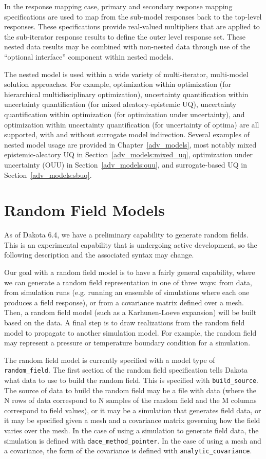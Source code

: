 In the response mapping case, primary and secondary response
mapping specifications are used to map from the sub-model responses
back to the top-level responses.  These specifications provide
real-valued multipliers that are applied to the sub-iterator response
results to define the outer level response set.  These nested data
results may be combined with non-nested data through use of the 
``optional interface'' component within nested models.

The nested model is used within a wide variety of multi-iterator,
multi-model solution approaches.  For example, optimization within
optimization (for hierarchical multidisciplinary optimization),
uncertainty quantification within uncertainty quantification (for
mixed aleatory-epistemic UQ), uncertainty quantification within
optimization (for optimization under uncertainty), and optimization
within uncertainty quantification (for uncertainty of optima) are all
supported, with and without surrogate model indirection.  Several
examples of nested model usage are provided in
Chapter~\ref{adv_models}, most notably mixed epistemic-aleatory UQ in
Section~\ref{adv_models:mixed_uq}, optimization under uncertainty
(OUU) in Section~\ref{adv_models:ouu}, and surrogate-based UQ in
Section~\ref{adv_models:sbuq}.

\section{Random Field Models} \label{models:randomfield}
As of Dakota 6.4, we have a preliminary capability to generate random fields. 
This is an experimental capability that is undergoing active development, 
so the following description and the associated syntax may change.  

Our goal with a random field model is to have a fairly general capability, where 
we can generate a random field representation in one of three ways: 
from data, from simulation runs (e.g. running an ensemble of simulations where 
each one produces a field response), or from a covariance matrix defined over 
a mesh. Then, a random field model (such as a Karhunen-Loeve expansion) will be 
built based on the data.  A final step is to draw realizations from the random 
field model to propagate to another simulation model.  For example, the random 
field may represent a pressure or temperature boundary condition for a simulation. 

The random field model is currently specified with a model type of 
\texttt{random\_field}.  The first 
section of the random field specification tells Dakota what data to use to 
build the random field.
This is specified with \texttt{build\_source}.  The source of data to build the
random field may be a file with data (where the N rows of data correspond to
N samples of the random field and the M columns correspond to field values),
or it may be a simulation that generates field data, or it may be specified
given a mesh and a covariance matrix governing how the field varies over the mesh.
In the case of using a simulation to generate field data, the simulation is
defined with \texttt{dace\_method\_pointer}.  In the case of using a mesh and a
covariance, the form of the covariance is defined with \texttt{analytic\_covariance}.

